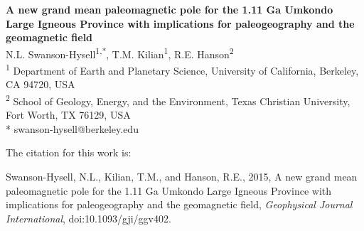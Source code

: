 \documentclass[11pt,letterpaper]{article}
\date{}
\begin{document}
\begin{flushleft}
{\Large \textbf{A new grand mean paleomagnetic pole for the 1.11 Ga Umkondo Large Igneous Province with implications for paleogeography and the geomagnetic field}}
\\
N.L. Swanson-Hysell\textsuperscript{1,*},
T.M. Kilian\textsuperscript{1},
R.E. Hanson\textsuperscript{2}
\\
\bigskip
\textsuperscript{1} Department of Earth and Planetary Science, University of California, Berkeley, CA 94720, USA
\\
\textsuperscript{2} School of Geology, Energy, and the Environment, Texas Christian University, Fort Worth, TX 76129, USA
\\
\bigskip
* swanson-hysell@berkeley.edu

The citation for this work is:

\hangindent=18pt {\footnotesize Swanson-Hysell, N.L., Kilian, T.M., and Hanson, R.E., 2015, A new grand mean paleomagnetic pole for the 1.11 Ga Umkondo Large Igneous Province with implications for paleogeography and the geomagnetic field, \textit{Geophysical Journal International}, doi:10.1093/gji/ggv402.}

\end{flushleft}

\end{document}
